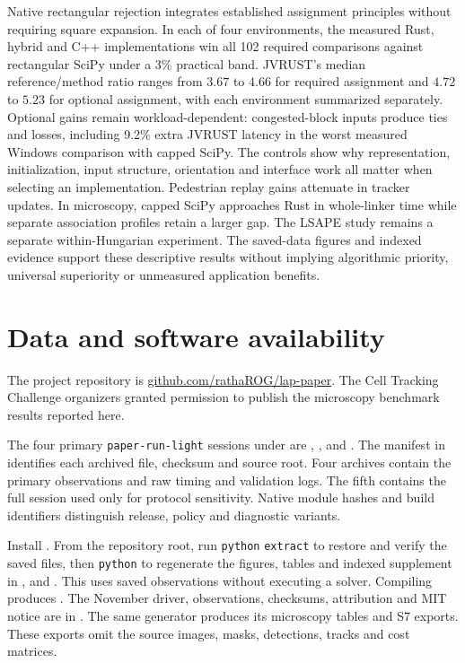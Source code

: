 \documentclass[11pt,a4paper]{article}
\begin{document}
Native rectangular rejection integrates established assignment principles without requiring square expansion. In each of four environments, the measured Rust, hybrid and C++ implementations win all 102 required comparisons against rectangular SciPy under a 3\% practical band. JVRUST's median reference/method ratio ranges from $3.67$ to $4.66$ for required assignment and $4.72$ to $5.23$ for optional assignment, with each environment summarized separately. Optional gains remain workload-dependent: congested-block inputs produce ties and losses, including 9.2\% extra JVRUST latency in the worst measured Windows comparison with capped SciPy. The controls show why representation, initialization, input structure, orientation and interface work all matter when selecting an implementation. Pedestrian replay gains attenuate in tracker updates. In microscopy, capped SciPy approaches Rust in whole-linker time while separate association profiles retain a larger gap. The LSAPE study remains a separate within-Hungarian experiment. The saved-data figures and indexed evidence support these descriptive results without implying algorithmic priority, universal superiority or unmeasured application benefits.

\FloatBarrier
\section*{Data and software availability}

The project repository is \href{https://github.com/rathaROG/lap-paper}{github.com/rathaROG/lap-paper}. The Cell Tracking Challenge organizers granted permission to publish the microscopy benchmark results reported here.

The four primary \texttt{paper-run-light} sessions under  are , ,  and . The manifest in  identifies each archived file, checksum and source root. Four archives contain the primary observations and raw timing and validation logs. The fifth contains the full session  used only for protocol sensitivity. Native module hashes and build identifiers distinguish release, policy and diagnostic variants.

Install . From the repository root, run \texttt{python}  \texttt{extract} to restore and verify the saved files, then \texttt{python}  to regenerate the figures, tables and indexed supplement in ,  and . This uses saved observations without executing a solver. Compiling  produces . The November driver, observations, checksums, attribution and MIT notice are in . The same generator produces its microscopy tables and S7 exports. These exports omit the source images, masks, detections, tracks and cost matrices.
\end{document}

